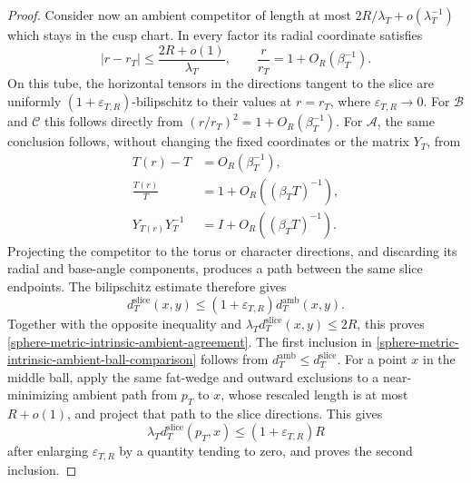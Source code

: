 \begin{proof}
Consider now an ambient competitor of length at most
\(2R/\lambda_T+o(\lambda_T^{-1})\) which stays in the cusp chart.  In every
factor its radial coordinate satisfies
\[
 |r-r_T|\leq \frac{2R+o(1)}{\lambda_T},
 \qquad
 \frac r{r_T}=1+O_R(\beta_T^{-1}).
\]
On this tube, the horizontal tensors in the directions tangent to the slice
are uniformly \((1+\varepsilon_{T,R})\)-bilipschitz to their values at
\(r=r_T\), where \(\varepsilon_{T,R}\to0\).  For
\(\mathcal B\) and \(\mathcal C\) this follows directly from
\((r/r_T)^2=1+O_R(\beta_T^{-1})\).  For \(\mathcal A\), the same conclusion
follows, without changing the fixed coordinates or the matrix \(Y_T\), from
\[
 \begin{aligned}
  T(r)-T&=O_R(\beta_T^{-1}),\\
  \frac{T(r)}T&=1+O_R((\beta_TT)^{-1}),\\
  Y_{T(r)}Y_T^{-1}&=I+O_R((\beta_TT)^{-1}).
 \end{aligned}
\]
Projecting the competitor to the torus or character directions, and
discarding its radial and base-angle components, produces a path between
the same slice endpoints.  The bilipschitz estimate therefore gives
\[
 d_T^{\mathrm{slice}}(x,y)
 \leq(1+\varepsilon_{T,R})d_T^{\mathrm{amb}}(x,y).
\]
Together with the opposite inequality and
\(\lambda_Td_T^{\mathrm{slice}}(x,y)\leq2R\), this proves
\eqref{sphere-metric-intrinsic-ambient-agreement}.  The first inclusion in
\eqref{sphere-metric-intrinsic-ambient-ball-comparison} follows from
\(d_T^{\mathrm{amb}}\leq d_T^{\mathrm{slice}}\).  For a point \(x\) in
the middle ball, apply the same fat-wedge and outward exclusions to a
near-minimizing ambient path from \(p_T\) to \(x\), whose rescaled length is
at most \(R+o(1)\), and project that path to the slice directions.  This
gives
\[
 \lambda_Td_T^{\mathrm{slice}}(p_T,x)
 \leq(1+\varepsilon_{T,R})R
\]
after enlarging \(\varepsilon_{T,R}\) by a quantity tending to zero, and
proves the second inclusion.


\end{proof}
